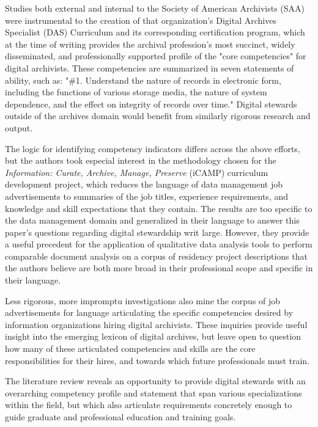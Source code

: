 \documentclass{acm_proc_article-sp}
\begin{document}
Studies both external\cite{16} and internal\cite{17} to the Society of American Archivists (SAA) were instrumental to the creation of that organization's Digital Archives Specialist (DAS) Curriculum and its corresponding certification program, which at the time of writing provides the archival profession's most succinct, widely disseminated, and professionally supported profile of the "core competencies" for digital archivists. These competencies are summarized in seven statements of ability, such as: "\#1. Understand the nature of records in electronic form, including the functions of various storage media, the nature of system dependence, and the effect on integrity of records over time." \cite{18} Digital stewards outside of the archives domain would benefit from similarly rigorous research and output.

The logic for identifying competency indicators differs across the above efforts, but the authors took especial interest in the methodology chosen for the \textit{Information: Curate, Archive, Manage, Preserve} (iCAMP) curriculum development project, which reduces the language of data management job advertisements to summaries of the job titles, experience requirements, and knowledge and skill expectations that they contain\cite{19}. The results are too specific to the data management domain and generalized in their language to answer this paper's questions regarding digital stewardship writ large. However, they provide a useful precedent for the application of qualitative data analysis tools to perform comparable document analysis on a corpus of residency project descriptions that the authors believe are both more broad in their professional scope and specific in their language. 

Less rigorous, more impromptu investigations\cite{20, 21} also mine the corpus of job advertisements for language articulating the specific competencies desired by information organizations hiring digital archivists. These inquiries provide useful insight into the emerging lexicon of digital archives, but leave open to question how many of these articulated competencies and skills are the core responsibilities for their hires, and towards which future professionals must train.

The literature review reveals an opportunity to provide digital stewards with an overarching competency profile and statement that span various specializations within the field, but which also articulate requirements concretely enough to guide graduate and professional education and training goals. 
\end{document}
